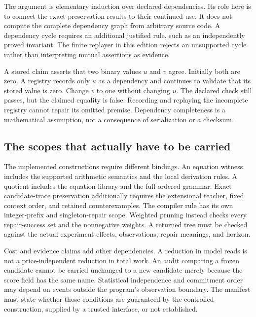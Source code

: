 The argument is elementary induction over declared dependencies. Its role here is to connect the exact preservation results to their continued use. It does not compute the complete dependency graph from arbitrary source code. A dependency cycle requires an additional justified rule, such as an independently proved invariant. The finite replayer in this edition rejects an unsupported cycle rather than interpreting mutual assertions as evidence.

\begin{SIIcounterexample}\label{SII:ex:incomplete-dependency}
A stored claim asserts that two binary values $u$ and $v$ agree. Initially both are zero. A registry records only $u$ as a dependency and continues to validate that its stored value is zero. Change $v$ to one without changing $u$. The declared check still passes, but the claimed equality is false. Recording and replaying the incomplete registry cannot repair its omitted premise. Dependency completeness is a mathematical assumption, not a consequence of serialization or a checksum.
\end{SIIcounterexample}

\subsection{The scopes that actually have to be carried}
The implemented constructions require different bindings. An equation witness includes the supported arithmetic semantics and the local derivation rules. A quotient includes the equation library and the full ordered grammar. Exact candidate-trace preservation additionally requires the extensional teacher, fixed context order, and retained counterexamples. The compiler rule has its own integer-prefix and singleton-repair scope. Weighted pruning instead checks every repair-success set and the nonnegative weights. A returned tree must be checked against the actual experiment effects, observations, repair meanings, and horizon.

Cost and evidence claims add other dependencies. A reduction in model reads is not a price-independent reduction in total work. An audit comparing a frozen candidate cannot be carried unchanged to a new candidate merely because the score field has the same name. Statistical independence and commitment order may depend on events outside the program's observation boundary. The manifest must state whether those conditions are guaranteed by the controlled construction, supplied by a trusted interface, or not established.


